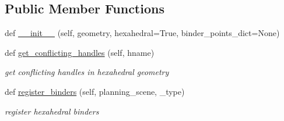\subsection*{Public Member Functions}
\begin{DoxyCompactItemize}
\item 
def \hyperlink{classrnb-planning_1_1src_1_1pkg_1_1planning_1_1constraint_1_1constraint__object_1_1_box_action_a3d630fe7b5eb41d2027bb77e8ffc1a34}{\+\_\+\+\_\+init\+\_\+\+\_\+} (self, geometry, hexahedral=True, binder\+\_\+points\+\_\+dict=None)
\item 
def \hyperlink{classrnb-planning_1_1src_1_1pkg_1_1planning_1_1constraint_1_1constraint__object_1_1_box_action_aaef71b97ab376e74ecaaa775c1541223}{get\+\_\+conflicting\+\_\+handles} (self, hname)
\begin{DoxyCompactList}\small\item\em get conflicting handles in hexahedral geometry \end{DoxyCompactList}\item 
def \hyperlink{classrnb-planning_1_1src_1_1pkg_1_1planning_1_1constraint_1_1constraint__object_1_1_box_action_a6e203fbad14b09536083a96c1374c297}{register\+\_\+binders} (self, planning\+\_\+scene, \+\_\+type)
\begin{DoxyCompactList}\small\item\em register hexahedral binders \end{DoxyCompactList}\end{DoxyCompactItemize}
